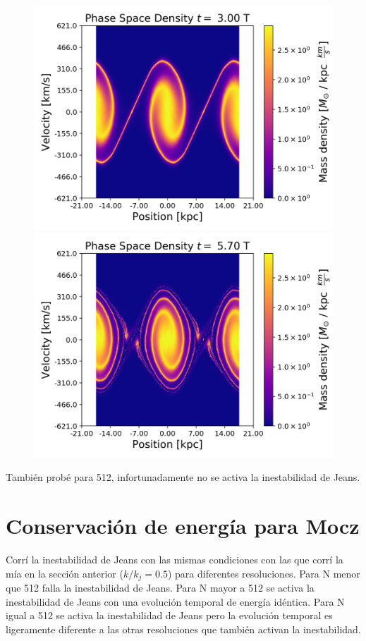 \documentclass[notitlepage,letterpaper,12pt]{article} %
\begin{document}
\begin{figure}[h]
         \includegraphics[scale= 0.5]{y1024phase30.png}
            \includegraphics[scale= 0.5]{y1024phase57.png}
  \label{fig: cobre}
\end{figure}	

También probé para 512, infortunadamente no se activa la inestabilidad de Jeans.


\section{Conservación de energía para Mocz}
Corrí la inestabilidad de Jeans con las mismas condiciones con las que corrí la mía en la sección anterior ($k/k_j = 0.5$) para diferentes resoluciones.
Para N menor que 512 falla la inestabilidad de Jeans.
Para N mayor a 512 se activa la inestabilidad de Jeans con una evolución temporal de energía idéntica.
Para N igual a 512 se activa la inestabilidad de Jeans pero la evolución temporal es ligeramente diferente a las otras resoluciones que también activan la inestabilidad.
\end{document}
